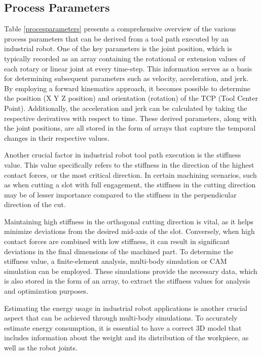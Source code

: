 
\subsection{Process Parameters}\label{pp}


Table \ref{procesparameters} presents a comprehensive overview of the various process parameters that can be derived from a tool path executed by an industrial robot. One of the key parameters is the joint position, which is typically recorded as an array containing the rotational or extension values of each rotary or linear joint at every time-step. This information serves as a basis for determining subsequent parameters such as velocity, acceleration, and jerk. By employing a forward kinematics approach, it becomes possible to determine the position (X Y Z position) and orientation (rotation) of the TCP (Tool Center Point). Additionally, the acceleration and jerk can be calculated by taking the respective derivatives with respect to time. These derived parameters, along with the joint positions, are all stored in the form of arrays that capture the temporal changes in their respective values.


Another crucial factor in industrial robot tool path execution is the stiffness value. This value specifically refers to the stiffness in the direction of the highest contact forces, or the most critical direction. In certain machining scenarios, such as when cutting a slot with full engagement, the stiffness in the cutting direction may be of lesser importance compared to the stiffness in the perpendicular direction of the cut.

Maintaining high stiffness in the orthogonal cutting direction is vital, as it helps minimize deviations from the desired mid-axis of the slot. Conversely, when high contact forces are combined with low stiffness, it can result in significant deviations in the final dimensions of the machined part.
To determine the stiffness value, a finite-element analysis, multi-body simulation or CAM simulation can be employed. These simulations provide the necessary data, which is also stored in the form of an array, to extract the stiffness values for analysis and optimization purposes.


Estimating the energy usage in industrial robot applications is another crucial aspect that can be achieved through multi-body simulations. To accurately estimate energy consumption, it is essential to have a correct 3D model that includes information about the weight and its distribution of the workpiece, as well as the robot joints.

